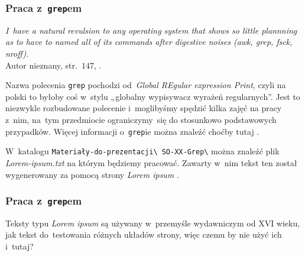 \documentclass[10pt,t]{beamer}
\begin{document}
\begin{frame}
  \frametitle{Praca z~\texttt{grep}em}


  \textit{I~have a natural revulsion to any operating system that shows so
    little plannning as to have to named all of its commands after digestive
    noises (awk, grep, fsck, nroff).} \\
    Autor nieznany, str.~$147$,
    \parencite{Garfinkel-Weise-Strassmann-The-UNIX-HATERS-Handbook-Pub-1994}.

  Nazwa polecenia \texttt{grep} pochodzi od~\textit{Global REgular
    expression Print}, czyli na polski to byłoby coś w~stylu „globalny
  wypisywacz wyrażeń regularnych”. Jest to niezwykle rozbudowane polecenie
  i~moglibyśmy spędzić kilka zajęć na pracy z~nim, na~tym przedmiocie
  ograniczymy~się do stosunkowo podstawowych przypadków. Więcej informacji
  o~\texttt{grep}ie można znaleźć choćby tutaj
  \parencite{Pankaj-Wailia-Mastering-Grep-command-in-Linux-Unix-ETC-Ver-2025}.

  W~katalogu \texttt{Materiały-do-prezentacji\textbackslash
    SO-XX-Grep\textbackslash} można znaleźć plik \textit{Lorem-ipsum.txt}
  na którym będziemy pracować. Zawarty w~nim tekst ten został wygenerowany
  za pomocą strony \textit{Lorem ipsum}
  .

\end{frame}





\begin{frame}
  \frametitle{Praca z~\texttt{grep}em}

  Teksty typu \textit{Lorem ipsum} są używany w~przemyśle wydawniczym od
  XVI wieku, jak tekst do~testowania różnych układów strony, więc czemu by
  nie użyć ich i~tutaj?

\end{frame}
\end{document}
